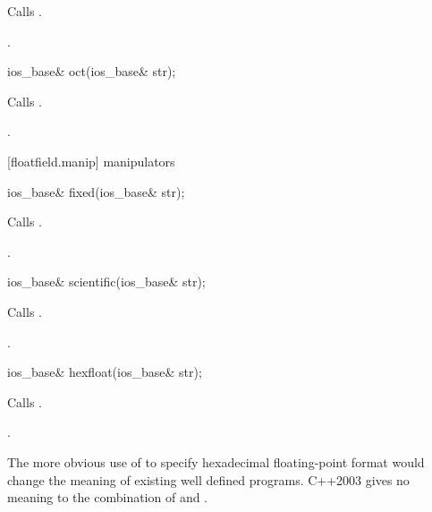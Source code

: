 \begin{itemdescr}
\pnum
\effects
Calls
.

\pnum
\returns
{}.
\end{itemdescr}

%
\begin{itemdecl}
ios_base& oct(ios_base& str);
\end{itemdecl}

\begin{itemdescr}
\pnum
\effects
Calls
.

\pnum
\returns
{}.
\end{itemdescr}

[floatfield.manip]{ manipulators}

%
\begin{itemdecl}
ios_base& fixed(ios_base& str);
\end{itemdecl}

\begin{itemdescr}
\pnum
\effects
Calls
.

\pnum
\returns
{}.
\end{itemdescr}

%
\begin{itemdecl}
ios_base& scientific(ios_base& str);
\end{itemdecl}

\begin{itemdescr}
\pnum
\effects
Calls
.

\pnum
\returns
{}.
\end{itemdescr}

%
\begin{itemdecl}
ios_base& hexfloat(ios_base& str);
\end{itemdecl}

\begin{itemdescr}
\pnum\effects Calls .

\pnum\returns {}.
\end{itemdescr}

\pnum
\enternote The more obvious use of
 to specify hexadecimal floating-point format would
change the meaning of existing well defined programs. C++2003
gives no meaning to the combination of  and
.\exitnote

